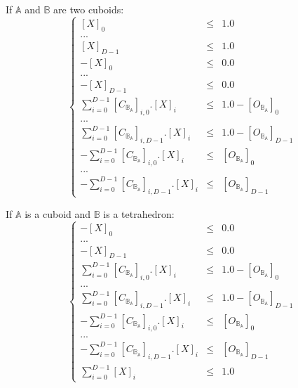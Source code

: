 \documentclass[12pt, a4paper]{article}
\begin{document}
If $\mathbb{A}$ and $\mathbb{B}$ are two cuboids:
\begin{equation}
\left\lbrace
\begin{array}{rcl}
\left[X\right]_0&\le&1.0\\
...\\
\left[X\right]_{D-1}&\le&1.0\\
-\left[X\right]_0&\le&0.0\\
...\\
-\left[X\right]_{D-1}&\le&0.0\\
\sum_{i=0}^{D-1}\left[C_{\mathbb{B}_\mathbb{A}}\right]_{i,0}.\left[X\right]_i&\le&1.0-\left[O_{\mathbb{B}_\mathbb{A}}\right]_0\\
...\\
\sum_{i=0}^{D-1}\left[C_{\mathbb{B}_\mathbb{A}}\right]_{i,D-1}.\left[X\right]_i&\le&1.0-\left[O_{\mathbb{B}_\mathbb{A}}\right]_{D-1}\\
-\sum_{i=0}^{D-1}\left[C_{\mathbb{B}_\mathbb{A}}\right]_{i,0}.\left[X\right]_i&\le&\left[O_{\mathbb{B}_\mathbb{A}}\right]_0\\
...\\
-\sum_{i=0}^{D-1}\left[C_{\mathbb{B}_\mathbb{A}}\right]_{i,D-1}.\left[X\right]_i&\le&\left[O_{\mathbb{B}_\mathbb{A}}\right]_{D-1}
\end{array}
\right.
\end{equation}

If $\mathbb{A}$ is a cuboid and $\mathbb{B}$ is a tetrahedron:
\begin{equation}
\left\lbrace
\begin{array}{rcl}
-\left[X\right]_0&\le&0.0\\
...\\
-\left[X\right]_{D-1}&\le&0.0\\
\sum_{i=0}^{D-1}\left[C_{\mathbb{B}_\mathbb{A}}\right]_{i,0}.\left[X\right]_i&\le&1.0-\left[O_{\mathbb{B}_\mathbb{A}}\right]_0\\
...\\
\sum_{i=0}^{D-1}\left[C_{\mathbb{B}_\mathbb{A}}\right]_{i,D-1}.\left[X\right]_i&\le&1.0-\left[O_{\mathbb{B}_\mathbb{A}}\right]_{D-1}\\
-\sum_{i=0}^{D-1}\left[C_{\mathbb{B}_\mathbb{A}}\right]_{i,0}.\left[X\right]_i&\le&\left[O_{\mathbb{B}_\mathbb{A}}\right]_0\\
...\\
-\sum_{i=0}^{D-1}\left[C_{\mathbb{B}_\mathbb{A}}\right]_{i,D-1}.\left[X\right]_i&\le&\left[O_{\mathbb{B}_\mathbb{A}}\right]_{D-1}\\
\sum_{i=0}^{D-1}\left[X\right]_i&\le&1.0
\end{array}
\right.
\end{equation}
\end{document}
